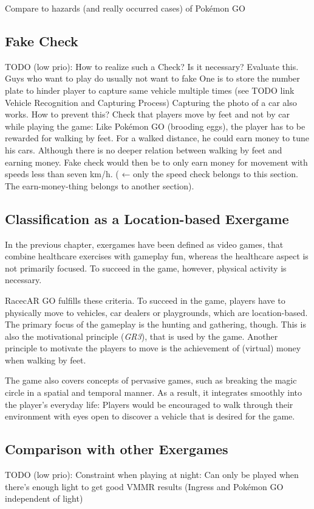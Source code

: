 Compare to hazards (and really occurred cases) of Pokémon GO

\subsection{Fake Check}
TODO (low prio):
How to realize such a Check?
Is it necessary? Evaluate this. Guys who want to play do usually not want to fake
One is to store the number plate to hinder player to capture same vehicle multiple times (see TODO link Vehicle Recognition and Capturing Process)
Capturing the photo of a car also works. How to prevent this?
Check that players move by feet and not by car while playing the game: Like Pokémon GO (brooding eggs), the player has to be rewarded for walking by feet. For a walked distance, he could earn money to tune his cars. Although there is no deeper relation between walking by feet and earning money. Fake check would then be to only earn money for movement with speeds less than seven km/h. ( ← only the speed check belongs to this section. The earn-money-thing belongs to another section).

\subsection{Classification as a Location-based Exergame}
In the previous chapter, exergames have been defined as video games, that combine healthcare exercises with gameplay fun, whereas the healthcare aspect is not primarily focused. To succeed in the game, however, physical activity is necessary.

RacecAR GO fulfills these criteria. To succeed in the game, players have to physically move to vehicles, car dealers or playgrounds, which are location-based. The primary focus of the gameplay is the hunting and gathering, though. This is also the motivational principle (\emph{GR3}), that is used by the game. Another principle to motivate the players to move is the achievement of (virtual) money when walking by feet.

The game also covers concepts of pervasive games, such as breaking the magic circle in a spatial and temporal manner. As a result, it integrates smoothly into the player's everyday life: Players would be encouraged to walk through their environment with eyes open to discover a vehicle that is desired for the game.

\subsection{Comparison with other Exergames}
TODO (low prio):
Constraint when playing at night: Can only be played when there’s enough light to get good VMMR results (Ingress and Pokémon GO independent of light)

